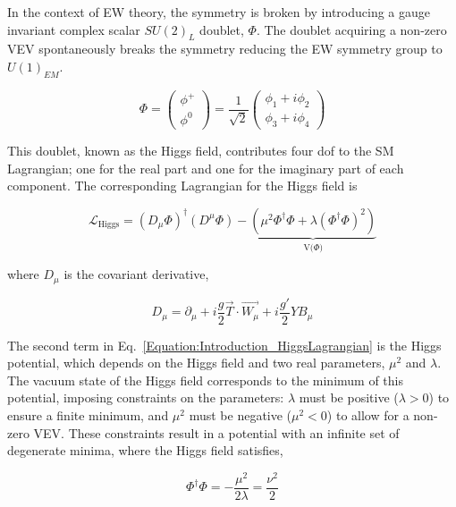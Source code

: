 In the context of EW theory, the symmetry is broken by introducing a gauge invariant complex scalar $SU(2)_{L}$ doublet, $\Phi$. The doublet acquiring a non-zero \ac{VEV} spontaneously breaks the symmetry reducing the EW symmetry group to $U(1)_{EM}$.

\begin{equation}
\Phi =
\begin{pmatrix}
\phi^{+} \\
\phi^{0} 
\end{pmatrix}
= \frac{1}{\sqrt{2}} \begin{pmatrix}
    \phi_{1} + i\phi_{2} \\
    \phi_{3} + i\phi_{4}
\end{pmatrix}
\end{equation}


This doublet, known as the Higgs field, contributes four \ac{dof} to the SM Lagrangian; one for the real part and one for the imaginary part of each component. The corresponding Lagrangian for the Higgs field is

\begin{equation}
    \mathcal{L}_{\text{Higgs}} = (D_{\mu} \Phi)^{\dagger}(D^{\mu}\Phi) - \underbrace{(\mu^{2}\Phi^{\dagger}\Phi + \lambda(\Phi^{\dagger}\Phi)^2)}_{\text{V($\Phi$)}}
\label{Equation:Introduction_HiggsLagrangian}
\end{equation}

where $D_{\mu}$ is the covariant derivative,

\begin{equation}
    D_{\mu} = \partial_{\mu} + i\frac{g}{2}\vec{T}\cdot\vec{W_{\mu}} + i\frac{g'}{2}YB_{\mu}
\end{equation}

The second term in Eq.~\ref{Equation:Introduction_HiggsLagrangian} is the Higgs potential, which depends on the Higgs field and two real parameters, $\mu^{2}$ and $\lambda$. The vacuum state of the Higgs field corresponds to the minimum of this potential, imposing constraints on the parameters: $\lambda$ must be positive ($\lambda > 0$) to ensure a finite minimum, and $\mu^{2}$ must be negative ($\mu^{2} < 0$) to allow for a non-zero VEV. These constraints result in a potential with an infinite set of degenerate minima, where the Higgs field satisfies,

\begin{equation}
    \Phi^{\dagger}\Phi = -\frac{\mu^{2}}{2\lambda} = \frac{\nu^2}{2}
\end{equation}

